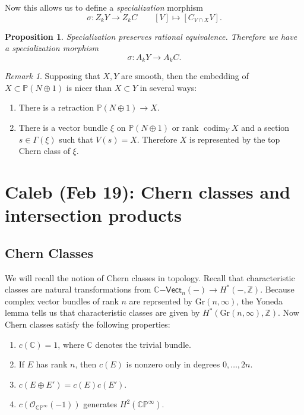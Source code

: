 \documentclass[leqno, openany]{memoir}
\newtheorem{prop}[thm]{Proposition}
\theoremstyle{definition}
\theoremstyle{remark}
\newtheorem{rmk}[thm]{Remark}
\theoremstyle{plain}
\theoremstyle{definition}
\theoremstyle{remark}
\newcommand{\C}{\mathbb{C}}
\newcommand{\Z}{\mathbb{Z}}
\renewcommand{\P}{\mathbb{P}}
\newcommand{\msc}[1]{\mathscr{#1}}
\newcommand{\mr}[1]{\mathrm{#1}}
\newcommand{\ms}[1]{\mathsf{#1}}
\begin{document}
Now this allows us to define a \textit{specialization} morphism
\[ \sigma \colon Z_k Y \to Z_k C \qquad [V] \mapsto [C_{V \cap X} V]. \]
\begin{prop}
    Specialization preserves rational equivalence. Therefore we have a specialization morphism
    \[ \sigma \colon A_k Y \to A_k C. \]
\end{prop}

\begin{rmk}
    Supposing that $X, Y$ are smooth, then the embedding of $X \subset \P(N \oplus 1)$ is nicer than $X \subset Y$ in several ways:
    \begin{enumerate}
        \item There is a retraction $\P(N \oplus 1) \to X$.
        \item There is a vector bundle $\xi$ on $\P(N \oplus 1)$ or rank $\operatorname{codim}_Y X$ and a section $s \in \Gamma(\xi)$ such that $V(s) = X$. Therefore $X$ is represented by the top Chern class of $\xi$.
    \end{enumerate}
\end{rmk}

\chapter{Caleb (Feb 19): Chern classes and intersection products}%
\label{cha:caleb_feb_19_chern_classes_and_intersection_products}

\section{Chern Classes}%
\label{sec:chern_classes}

We will recall the notion of Chern classes in topology. Recall that characteristic classes are natural transformations from $\C\ms{-Vect}_n(-) \to H^*(-, \Z)$. Because complex vector bundles of rank $n$ are reprsented by $\mr{Gr}(n, \infty)$, the Yoneda lemma tells us that characteristic classes are given by $H^*(\mr{Gr}(n, \infty), \Z)$. Now Chern classes satisfy the following properties:
\begin{enumerate}
    \item $c(\C) = 1$, where $\C$ denotes the trivial bundle.
    \item If $E$ has rank $n$, then $c(E)$ is nonzero only in degrees $0, \ldots, 2n$.
    \item $c(E \oplus E') = c(E) c(E')$.
    \item $c(\msc{O}_{\C\P^{\infty}}(-1))$ generates $H^2(\C\P^{\infty})$.
\end{enumerate}
\end{document}
